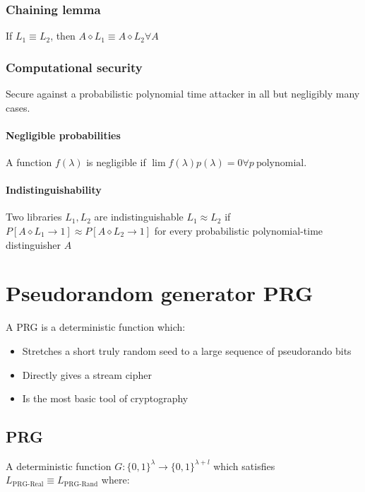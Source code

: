 \documentclass[a4paper]{scrreprt}
\begin{document}
\subsection{Chaining lemma}

If $L_1 \equiv L_2$, then $A \diamond L_1 \equiv A \diamond L_2 \forall A$

\subsection{Computational security}

Secure against a probabilistic polynomial time attacker in all but negligibly
many cases.

\subsubsection{Negligible probabilities}

A function $f(\lambda)$ is negligible if $\lim f(\lambda) p(\lambda) = 0
\forall p\ \text{polynomial}$.

\subsubsection{Indistinguishability}

Two libraries $L_1, L_2$ are indistinguishable $L_1 \approx L_2$ if $P[A
\diamond L_1 \rightarrow 1] \approx P[A \diamond L_2 \rightarrow 1]$ for every
probabilistic polynomial-time distinguisher $A$

\chapter{Pseudorandom generator PRG}

A PRG is a deterministic function which:
\begin{itemize}
	\item Stretches a short truly random seed to a large sequence of pseudorando bits
	\item Directly gives a stream cipher
	\item Is the most basic tool of cryptography
\end{itemize}

\section{PRG}

A deterministic function $G: \{0, 1\}^\lambda \rightarrow \{0, 1\}^{\lambda +
l}$ which satisfies $L_{\text{PRG-Real}} \equiv L_{\text{PRG-Rand}}$ where:
\end{document}
